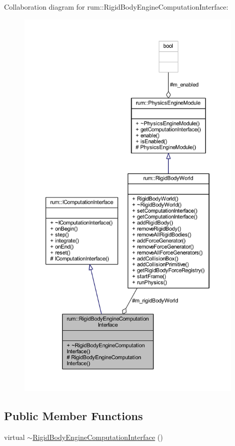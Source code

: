 Collaboration diagram for rum\+:\+:Rigid\+Body\+Engine\+Computation\+Interface\+:\nopagebreak
\begin{figure}[H]
\begin{center}
\leavevmode
\includegraphics[height=550pt]{classrum_1_1_rigid_body_engine_computation_interface__coll__graph}
\end{center}
\end{figure}
\subsection*{Public Member Functions}
\begin{DoxyCompactItemize}
\item 
virtual \mbox{\hyperlink{classrum_1_1_rigid_body_engine_computation_interface_ae707ec2510b8da565bf7604770b0ef22}{$\sim$\+Rigid\+Body\+Engine\+Computation\+Interface}} ()
\end{DoxyCompactItemize}
